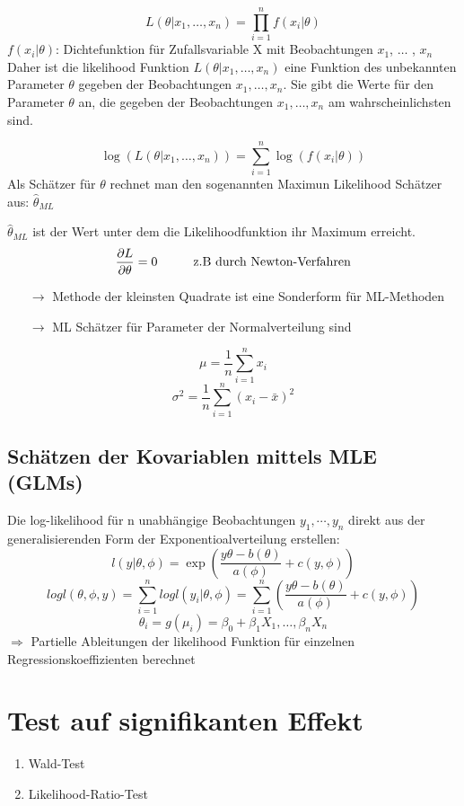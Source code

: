 \documentclass[10pt]{report}
\newcommand\tab[1][1cm]{\hspace*{#1}}
\theoremstyle{definition}
\begin{document}
\[
L(\theta|x_1, \ldots, x_n)  = \prod_{i=1}^{n} f(x_i|\theta)
\]
$f(x_i|\theta)$: Dichtefunktion für Zufallsvariable X mit Beobachtungen $x_1$, $\ldots$ , $x_n$\\

Daher ist die likelihood Funktion  $L(\theta|x_1, \ldots, x_n)$ eine Funktion des unbekannten Parameter $\theta$ gegeben der Beobachtungen $x_1, \ldots, x_n$. Sie gibt die Werte für den Parameter $\theta$ an, die gegeben der Beobachtungen $x_1,\ldots, x_n$ am wahrscheinlichsten sind.

\[
\log (L(\theta|x_1, \ldots, x_n))  = \sum_{i=1}^{n} \log(f(x_i|\theta))
\]
Als Schätzer für $\theta$ rechnet man den sogenannten Maximun Likelihood Schätzer aus: $\hat{\theta}_{ML}$

$\hat{\theta}_{ML}$ ist der Wert unter dem die Likelihoodfunktion ihr Maximum erreicht.
\[
\frac{\partial L}{\partial \theta} = 0 \text{\tab z.B durch Newton-Verfahren}
\]


\begin{itemize}
	\item[$\rightarrow$] Methode der kleinsten Quadrate ist eine Sonderform für ML-Methoden
	\item[$\rightarrow$] ML Schätzer für Parameter der Normalverteilung sind 
\end{itemize}


\[\mu = \frac{1}{n} \sum_{i = 1}^{n} x_i \]
\[\sigma^2 = \frac{1}{n} \sum_{i = 1}^{n}(x_i - \bar{x})^2\]

\subsection{Schätzen der Kovariablen mittels MLE (GLMs)}
Die log-likelihood für n unabhängige Beobachtungen $y_1,\cdots,y_n$ direkt aus der generalisierenden Form der Exponentioalverteilung erstellen:
\[ l(y|\theta, \phi) = \exp \left( \frac{y \theta - b(\theta)}{a(\phi)} + c(y,\phi) \right) \]
\[ log l (\theta, \phi, y) = \sum\limits_{i=1}^{n} log l (y_i | \theta, \phi) = \sum\limits_{i=1}^{n} \left( \frac{y \theta - b(\theta)}{a(\phi)} + c(y,\phi) \right) \]
\[\theta_i = g(\mu_i)=\beta_0 + \beta_1 X_1,\dots,\beta_n X_n \]
$\Rightarrow$ Partielle Ableitungen der likelihood Funktion für einzelnen Regressionskoeffizienten berechnet

\section{Test auf signifikanten Effekt}
\begin{enumerate}
	\item Wald-Test
	\item Likelihood-Ratio-Test
\end{enumerate}
\end{document}
